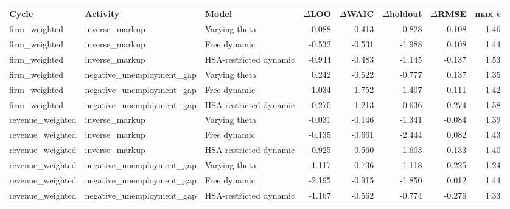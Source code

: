 \begin{tabular}{@{}lllrrrrr@{}}
\toprule
Cycle & Activity & Model & $\Delta$LOO & $\Delta$WAIC & $\Delta$holdout & $\Delta$RMSE & max $k$ \\
\midrule
firm\_weighted & inverse\_markup & Varying theta & -0.088 & -0.413 & -0.828 & -0.108 & 1.46 \\
firm\_weighted & inverse\_markup & Free dynamic & -0.532 & -0.531 & -1.988 & 0.108 & 1.44 \\
firm\_weighted & inverse\_markup & HSA-restricted dynamic & -0.944 & -0.483 & -1.145 & -0.137 & 1.53 \\
firm\_weighted & negative\_unemployment\_gap & Varying theta & 0.242 & -0.522 & -0.777 & 0.137 & 1.35 \\
firm\_weighted & negative\_unemployment\_gap & Free dynamic & -1.034 & -1.752 & -1.407 & -0.111 & 1.42 \\
firm\_weighted & negative\_unemployment\_gap & HSA-restricted dynamic & -0.270 & -1.213 & -0.636 & -0.274 & 1.58 \\
revenue\_weighted & inverse\_markup & Varying theta & -0.031 & -0.146 & -1.341 & -0.084 & 1.39 \\
revenue\_weighted & inverse\_markup & Free dynamic & -0.135 & -0.661 & -2.444 & 0.082 & 1.43 \\
revenue\_weighted & inverse\_markup & HSA-restricted dynamic & -0.925 & -0.560 & -1.603 & -0.133 & 1.40 \\
revenue\_weighted & negative\_unemployment\_gap & Varying theta & -1.117 & -0.736 & -1.118 & 0.225 & 1.24 \\
revenue\_weighted & negative\_unemployment\_gap & Free dynamic & -2.195 & -0.915 & -1.850 & 0.012 & 1.44 \\
revenue\_weighted & negative\_unemployment\_gap & HSA-restricted dynamic & -1.167 & -0.562 & -0.774 & -0.276 & 1.33 \\
\bottomrule
\end{tabular}
